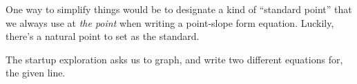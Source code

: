 One way to simplify things would be to designate a kind of ``standard point'' that we always use at \textit{the point} when writing a point-slope form equation. Luckily, there's a natural point to set as the standard.

The startup exploration asks us to graph, and write two different equations for, the given line.

\begin{center}
\end{center}
%


